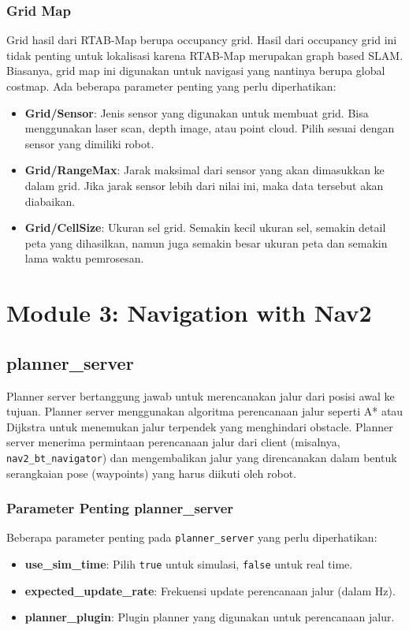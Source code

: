 \documentclass{article}
\begin{document}
\subsubsection{Grid Map}
Grid hasil dari RTAB-Map berupa occupancy grid. Hasil dari occupancy grid ini tidak penting untuk lokalisasi karena RTAB-Map merupakan graph based SLAM. Biasanya, grid map ini digunakan untuk navigasi yang nantinya berupa global costmap. Ada beberapa parameter penting yang perlu diperhatikan:
\begin{itemize}
  \item \textbf{Grid/Sensor}: Jenis sensor yang digunakan untuk membuat grid. Bisa menggunakan laser scan, depth image, atau point cloud. Pilih sesuai dengan sensor yang dimiliki robot.
  \item \textbf{Grid/RangeMax}: Jarak maksimal dari sensor yang akan dimasukkan ke dalam grid. Jika jarak sensor lebih dari nilai ini, maka data tersebut akan diabaikan.
  \item \textbf{Grid/CellSize}: Ukuran sel grid. Semakin kecil ukuran sel, semakin detail peta yang dihasilkan, namun juga semakin besar ukuran peta dan semakin lama waktu pemrosesan.
\end{itemize}

\section{Module 3: Navigation with Nav2}
\subsection{planner\_server}
Planner server bertanggung jawab untuk merencanakan jalur dari posisi awal ke tujuan. Planner server menggunakan algoritma perencanaan jalur seperti A* atau Dijkstra untuk menemukan jalur terpendek yang menghindari obstacle. Planner server menerima permintaan perencanaan jalur dari client (misalnya, \texttt{nav2\_bt\_navigator}) dan mengembalikan jalur yang direncanakan dalam bentuk serangkaian pose (waypoints) yang harus diikuti oleh robot.
\subsubsection*{Parameter Penting planner\_server}
Beberapa parameter penting pada \texttt{planner\_server} yang perlu diperhatikan:
\begin{itemize}
  \item \textbf{use\_sim\_time}: Pilih \texttt{true} untuk simulasi, \texttt{false} untuk real time.
  \item \textbf{expected\_update\_rate}: Frekuensi update perencanaan jalur (dalam Hz).
  \item \textbf{planner\_plugin}: Plugin planner yang digunakan untuk perencanaan jalur.
\end{itemize}
\end{document}
